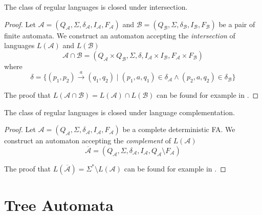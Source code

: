   \begin{theorem}
	 The class of regular languages is closed under intersection.
	\end{theorem}
	
	\begin{proof}
Let $\mathcal{A} = (Q_\mathcal{A}, \Sigma, \delta_\mathcal{A}, I_\mathcal{A},
F_\mathcal{A})$ and $\mathcal{B} = (Q_\mathcal{B}, \Sigma, \delta_\mathcal{B},
I_\mathcal{B}, F_\mathcal{B})$ be a pair of finite automata. We construct an
automaton accepting the \emph{intersection} of languages $L(\mathcal{A})$ and
$L(\mathcal{B})$ 
\begin{equation}
\mathcal{A} \cap \mathcal{B} = (Q_\mathcal{A} \times
Q_\mathcal{B}, \Sigma, \delta, I_\mathcal{A} \times I_\mathcal{B}, F_\mathcal{A}
\times F_\mathcal{B})
\end{equation} where 
\begin{equation}
\delta = \{(p_1, p_2)
\overset{a}{\longrightarrow} (q_1, q_2) \mid (p_1, a, q_1) \in \delta_\mathcal{A}
\wedge (p_2, a, q_2) \in \delta_\mathcal{B}\}
\end{equation}
	
The proof that $L(\mathcal{A} \cap \mathcal{B}) = L(\mathcal{A}) \cap
L(\mathcal{B})$ can be found for example in \cite{tin}.
\end{proof}
	
 \begin{theorem}
  The class of regular languages is closed under language complementation.
\end{theorem}
	
	\begin{proof}
Let $\mathcal{A} = (Q_\mathcal{A}, \Sigma, \delta_\mathcal{A}, I_\mathcal{A},
F_\mathcal{A})$ be a complete deterministic FA. We construct an automaton
accepting the \emph{complement} of $L(\mathcal{A})$ 
\begin{equation}
\overline{\mathcal{A}} =
(Q_\mathcal{A}, \Sigma, \delta_\mathcal{A}, I_\mathcal{A}, Q_\mathcal{A}
\setminus F_\mathcal{A})
\end{equation}
	
The proof that $L(\overline{\mathcal{A}}) = \Sigma^* \setminus L(\mathcal{A})$
can be found for example in \cite{tin}.
 \end{proof}

 \section{Tree Automata}

